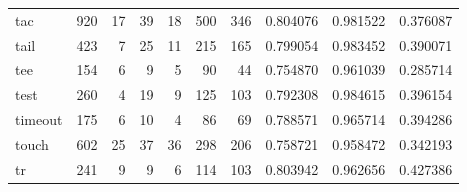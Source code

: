 \begin{tabular}{lrrrrrrrrr}
tac       &                    920 &                                 17 &                                39 &                               18 &                               500 &                             346 &                                0.804076 &                               0.981522 &                             0.376087 \\
tail      &                    423 &                                  7 &                                25 &                               11 &                               215 &                             165 &                                0.799054 &                               0.983452 &                             0.390071 \\
tee       &                    154 &                                  6 &                                 9 &                                5 &                                90 &                              44 &                                0.754870 &                               0.961039 &                             0.285714 \\
test      &                    260 &                                  4 &                                19 &                                9 &                               125 &                             103 &                                0.792308 &                               0.984615 &                             0.396154 \\
timeout   &                    175 &                                  6 &                                10 &                                4 &                                86 &                              69 &                                0.788571 &                               0.965714 &                             0.394286 \\
touch     &                    602 &                                 25 &                                37 &                               36 &                               298 &                             206 &                                0.758721 &                               0.958472 &                             0.342193 \\
tr        &                    241 &                                  9 &                                 9 &                                6 &                               114 &                             103 &                                0.803942 &                               0.962656 &                             0.427386 \\

\end{tabular}
